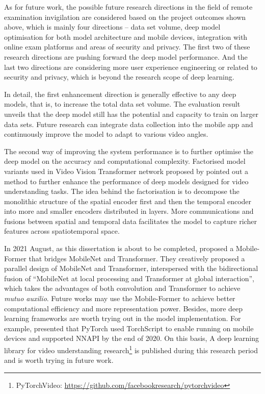 As for future work, the possible future research directions in the field of remote examination invigilation are considered based on the project outcomes shown above, which is mainly four directions -- data set volume, deep model optimisation for both model architecture and mobile devices, integration with online exam platforms and areas of security and privacy.
The first two of these research directions are pushing forward the deep model performance.
And the last two directions are considering more user experience engineering or related to security and privacy, which is beyond the research scope of deep learning.

In detail, the first enhancement direction is generally effective to any deep models, that is, to increase the total data set volume.
The evaluation result unveils that the deep model still has the potential and capacity to train on larger data sets.
Future research can integrate data collection into the mobile app and continuously improve the model to adapt to various video angles.

The second way of improving the system performance is to further optimise the deep model on the accuracy and computational complexity.
Factorised model variants used in Video Vision Transformer network proposed by \citet{arnab2021vivit} pointed out a method to further enhance the performance of deep models designed for video understanding tasks.
The idea behind the factorisation is to decompose the monolithic structure of the spatial encoder first and then the temporal encoder into more and smaller encoders distributed in layers.
More communications and fusions between spatial and temporal data facilitates the model to capture richer features across spatiotemporal space.

In 2021 August, as this dissertation is about to be completed, \citet{chen2021mobileformer} proposed a Mobile-Former that bridges MobileNet and Transformer.
They creatively proposed a parallel design of MobileNet and Transformer, interspersed with the bidirectional fusion of ``MobileNet at local processing and Transformer at global interaction'', which takes the advantages of both convolution and Transformer to achieve \textit{mutuo auxilio}.
Future works may use the Mobile-Former to achieve better computational efficiency and more representation power.
Besides, more deep learning frameworks are worth trying out in the model implementation.
For example, \citet{reiss2020pytorch} presented that PyTorch used TorchScript to enable running on mobile devices and supported NNAPI by the end of 2020.
On this basis, A deep learning library for video understanding research\footnote{PyTorchVideo: \url{https://github.com/facebookresearch/pytorchvideo}} is published during this research period and is worth trying in future work.
